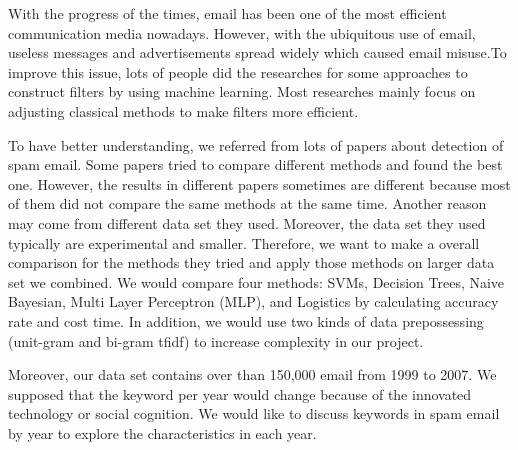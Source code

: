 
\quad  With the progress of the times, email has been one of the most efficient communication media nowadays. However, with the ubiquitous use of email, useless messages and advertisements spread widely which caused email misuse.To improve this issue, lots of people did the researches for some approaches to construct filters by using machine learning. Most researches mainly focus on adjusting classical methods to make filters more efficient.

\quad To have better understanding, we referred from lots of papers about detection of spam email. Some papers tried to compare different methods and found the best one. However, the results in different papers sometimes are different because most of them did not compare the same methods at the same time. Another reason may come from different data set they used. Moreover, the data set they used typically are experimental and smaller. Therefore, we want to make a overall comparison for the methods they tried and apply those methods on larger data set we combined. We would compare four methods: SVMs, Decision Trees, Naive Bayesian, Multi Layer Perceptron (MLP), and Logistics by calculating accuracy rate and cost time. In addition, we would use two kinds of data prepossessing (unit-gram and bi-gram tfidf) to increase complexity in our project.

\quad Moreover, our data set contains over than 150,000 email from 1999 to 2007. We supposed that the keyword per year would change because of the innovated technology or social cognition. We would like to discuss keywords in spam email by year to explore the characteristics in each year.
\quad 


